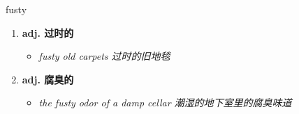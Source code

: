 
\begin{frame}
{\huge fusty}
\begin{center}
\begin{enumerate}\Large
  \item \textbf{adj. 过时的}
  \begin{itemize}
    \item \em{\Large{fusty old carpets 过时的旧地毯}}
  \end{itemize}
  \item \textbf{adj. 腐臭的}
  \begin{itemize}
    \item \em{\Large{the fusty odor of a damp cellar 潮湿的地下室里的腐臭味道}}
  \end{itemize}
\end{enumerate}
\end{center}
\end{frame}
